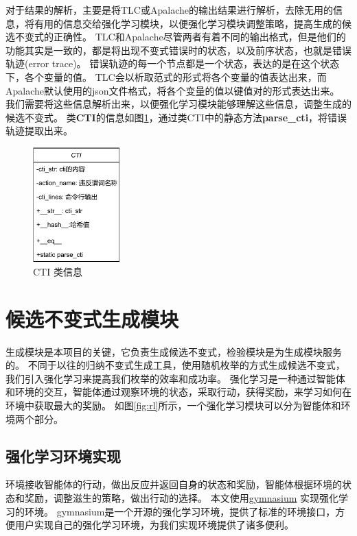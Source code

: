 对于结果的解析，主要是将TLC或Apalache的输出结果进行解析，去除无用的信息，将有用的信息交给强化学习模块，以便强化学习模块调整策略，提高生成的候选不变式的正确性。
TLC和Apalache尽管两者有着不同的输出格式，但是他们的功能其实是一致的，都是将出现不变式错误时的状态，以及前序状态，也就是错误轨迹(error trace)。
错误轨迹的每一个节点都是一个状态，表达的是在这个状态下，各个变量的值。
TLC会以析取范式的形式将各个变量的值表达出来，而Apalache默认使用的json文件格式，将各个变量的值以键值对的形式表达出来。
我们需要将这些信息解析出来，以便强化学习模块能够理解这些信息，调整生成的候选不变式。
类\textbf{CTI}的信息如图\ref{fig:class_cti}，通过类CTI中的静态方法\textbf{parse\_cti}，将错误轨迹提取出来。
\begin{figure}[h]
    \centering
    \includegraphics[width=0.3\textwidth]{figures/class_cti.pdf}
    \caption{CTI 类信息}
    \label{fig:class_cti}
\end{figure}
\section{候选不变式生成模块}

生成模块是本项目的关键，它负责生成候选不变式，检验模块是为生成模块服务的。
不同于以往的归纳不变式生成工具，使用随机枚举的方式生成候选不变式，我们引入强化学习来提高我们枚举的效率和成功率。
强化学习是一种通过智能体和环境的交互，智能体通过观察环境的状态，采取行动，获得奖励，来学习如何在环境中获取最大的奖励。
如图\ref{fig:rl}所示，一个强化学习模块可以分为智能体和环境两个部分。

\subsection{强化学习环境实现}

环境接收智能体的行动，做出反应并返回自身的状态和奖励，智能体根据环境的状态和奖励，调整滋生的策略，做出行动的选择。
本文使用\href{https://gymnasium.farama.org/}{gymnasium} \cite{gymnasium} 实现强化学习的环境。
gymnasium是一个开源的强化学习环境，提供了标准的环境接口，方便用户实现自己的强化学习环境，为我们实现环境提供了诸多便利。

